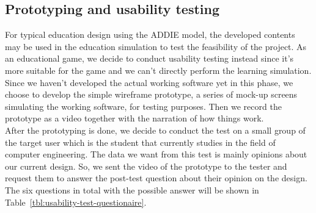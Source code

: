 \documentclass[12pt,oneside,openright,a4paper]{cpe-english-project}
\begin{document}
\subsection{Prototyping and usability testing}
For typical education design using the ADDIE model, the developed contents may be used in the education simulation to test the feasibility of the project. As an educational game, we decide to conduct usability testing instead since it's more suitable for the game and we can't directly perform the learning simulation. \\
Since we haven't developed the actual working software yet in this phase, we choose to develop the simple wireframe prototype, a series of mock-up screens simulating the working software, for testing purposes. Then we record the prototype as a video together with the narration of how things work. \\
After the prototyping is done, we decide to conduct the test on a small group of the target user which is the student that currently studies in the field of computer engineering. The data we want from this test is mainly opinions about our current design. So, we sent the video of the prototype to the tester and request them to answer the post-test question about their opinion on the design. The six questions in total with the possible answer will be shown in Table~\ref{tbl:usability-test-questionaire}.
\end{document}
